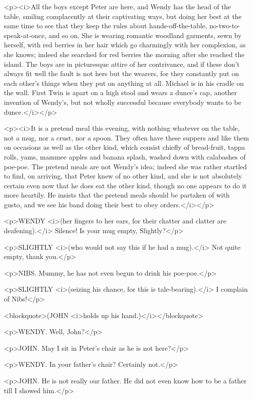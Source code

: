 <p><i>All the boys except Peter are here, and Wendy has the head of the table, smiling complacently at their captivating ways, but doing her best at the same time to see that they keep the rules about hands-off-the-table, no-two-to-speak-at-once, and so on. She is wearing romantic woodland garments, sewn by herself, with red berries in her hair which go charmingly with her complexion, as she knows; indeed she searched for red berries the morning after she reached the island. The boys are in picturesque attire of her contrivance, and if these don't always fit well the fault is not hers but the wearers, for they constantly put on each other's things when they put on anything at all. Michael is in his cradle on the wall. First Twin is apart on a high stool and wears a dunce's cap, another invention of Wendy's, but not wholly successful because everybody wants to be dunce.</i></p>

<p><i>It is a pretend meal this evening, with nothing whatever on the table, not a mug, nor a crust, nor a spoon. They often have these suppers and like them on occasions as well as the other kind, which consist chiefly of bread-fruit, tappa rolls, yams, mammee apples and banana splash, washed down with calabashes of poe-poe. The pretend meals are not Wendy's idea; indeed she was rather startled to find, on arriving, that Peter knew of no other kind, and she is not absolutely certain even now that he does eat the other kind, though no one appears to do it more heartily. He insists that the pretend meals should be partaken of with gusto, and we see his band doing their best to obey orders.</i></p>

<p>WENDY <i>(her fingers to her ears, for their chatter and clatter are deafening).</i> Silence! Is your mug empty, Slightly?</p>

<p>SLIGHTLY <i>(who would not say this if he had a mug).</i> Not quite empty, thank you.</p>

<p>NIBS. Mummy, he has not even begun to drink his poe-poe.</p>

<p>SLIGHTLY <i>(seizing his chance, for this is tale-bearing).</i> I complain of Nibs!</p>

<blockquote>(JOHN <i>holds up his hand.)</i></blockquote>

<p>WENDY. Well, John?</p>

<p>JOHN. May I sit in Peter's chair as he is not here?</p>

<p>WENDY. In your father's chair? Certainly not.</p>

<p>JOHN. He is not really our father. He did not even know how to be a father till I showed him.</p>

